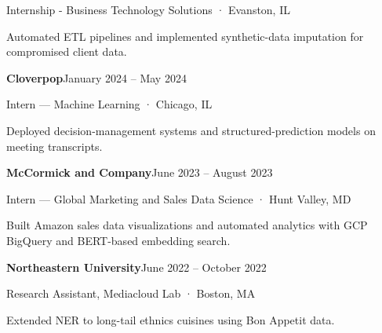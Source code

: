\documentclass[10pt,letterpaper]{article}
\begin{document}
{\small\sffamily\color{muted}Internship - Business Technology Solutions · Evanston, IL}\par
Automated ETL pipelines and implemented synthetic-data imputation for compromised client data.\par\vspace{3pt}
\textbf{Cloverpop}\hfill {\small\sffamily January 2024 – May 2024}\par
{\small\sffamily\color{muted}Intern — Machine Learning · Chicago, IL}\par
Deployed decision-management systems and structured-prediction models on meeting transcripts.\par\vspace{3pt}
\textbf{McCormick and Company}\hfill {\small\sffamily June 2023 – August 2023}\par
{\small\sffamily\color{muted}Intern — Global Marketing and Sales Data Science · Hunt Valley, MD}\par
Built Amazon sales data visualizations and automated analytics with GCP BigQuery and BERT-based embedding search.\par\vspace{3pt}
\textbf{Northeastern University}\hfill {\small\sffamily June 2022 – October 2022}\par
{\small\sffamily\color{muted}Research Assistant, Mediacloud Lab · Boston, MA}\par
Extended NER to long-tail ethnics cuisines using Bon Appetit data.\par\vspace{3pt}
\newpage
\end{document}
